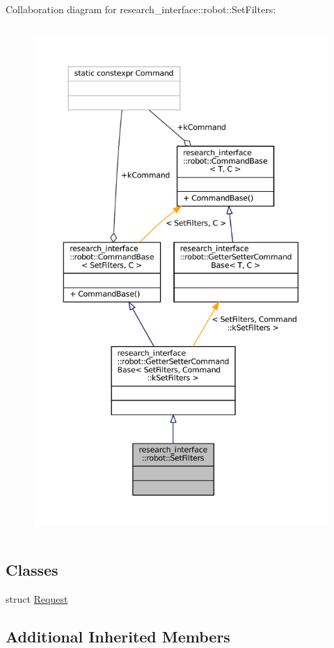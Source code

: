 Collaboration diagram for research\+\_\+interface\+:\+:robot\+:\+:Set\+Filters\+:
\nopagebreak
\begin{figure}[H]
\begin{center}
\leavevmode
\includegraphics[height=550pt]{structresearch__interface_1_1robot_1_1SetFilters__coll__graph}
\end{center}
\end{figure}
\subsection*{Classes}
\begin{DoxyCompactItemize}
\item 
struct \hyperlink{structresearch__interface_1_1robot_1_1SetFilters_1_1Request}{Request}
\end{DoxyCompactItemize}
\subsection*{Additional Inherited Members}


